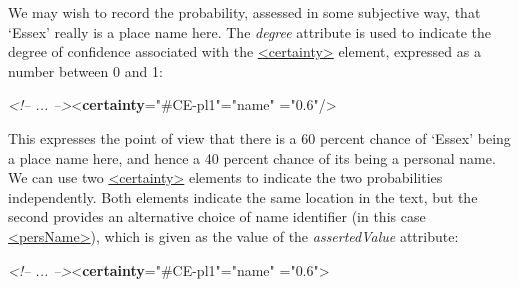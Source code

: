 We may wish to record the probability, assessed in some subjective way, that ‘Essex’ really is a place name here. The {\itshape degree} attribute is used to indicate the degree of confidence associated with the \hyperref[TEI.certainty]{<certainty>} element, expressed as a number between 0 and 1: \par\bgroup{}\exampleFont \begin{shaded}\noindent\mbox{}\mbox{}\newline 
\textit{<!-- ... -->}{<\textbf{certainty}\hspace*{1em}{target}="{\#CE-pl1}"\hspace*{1em}{locus}="{name}"\mbox{}\newline 
\hspace*{1em}{degree}="{0.6}"/>}\end{shaded}\egroup\par \noindent  This expresses the point of view that there is a 60 percent chance of ‘Essex’ being a place name here, and hence a 40 percent chance of its being a personal name. We can use two \hyperref[TEI.certainty]{<certainty>} elements to indicate the two probabilities independently. Both elements indicate the same location in the text, but the second provides an alternative choice of name identifier (in this case \hyperref[TEI.persName]{<persName>}), which is given as the value of the {\itshape assertedValue} attribute: \par\bgroup{}\exampleFont \begin{shaded}\noindent\mbox{}\mbox{}\newline 
\textit{<!-- ... -->}{<\textbf{certainty}\hspace*{1em}{target}="{\#CE-pl1}"\hspace*{1em}{locus}="{name}"\mbox{}\newline 
\hspace*{1em}{degree}="{0.6}">}\mbox{}\newline 

\end{shaded}
